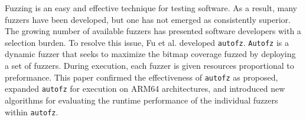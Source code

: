 \begin{Abstract}
Fuzzing is an easy and effective technique for testing software. As a result, 
many fuzzers have been developed, but one has not emerged as consistently superior. 
The growing number of available fuzzers has presented software developers with a 
selection burden.  To resolve this issue, Fu et al. developed \texttt{autofz}. 
\texttt{Autofz} is a dynamic fuzzer that seeks to maximize the bitmap coverage fuzzed
by deploying a set of fuzzers. During execution, each fuzzer is given resources 
proportional to preformance. This paper confirmed the effectiveness of \texttt{autofz} 
as proposed, expanded \texttt{autofz} for execution on ARM64 architectures, and introduced new
algorithms for evaluating the runtime performance of the individual fuzzers within 
\texttt{autofz}.
\end{Abstract}